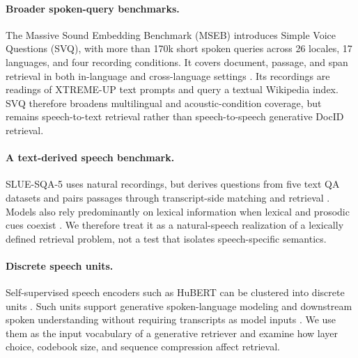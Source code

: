{\paragraph{Broader spoken-query benchmarks.}
The Massive Sound Embedding Benchmark (MSEB) introduces Simple Voice Questions
(SVQ), with more than 170k short spoken queries across 26 locales, 17
languages, and four recording conditions. It covers document, passage, and span
retrieval in both in-language and cross-language settings
\citep{Heigold2025MSEB}. Its recordings are readings of XTREME-UP text prompts
and query a textual Wikipedia index. SVQ therefore broadens multilingual and
acoustic-condition coverage, but remains speech-to-text retrieval rather than
speech-to-speech generative DocID retrieval.

\paragraph{A text-derived speech benchmark.}
SLUE-SQA-5 uses natural recordings, but derives questions from five text QA
datasets and pairs passages through transcript-side matching and retrieval
\citep{Shon2022SLUEPA}. Models also rely predominantly on lexical information
when lexical and prosodic cues coexist \citep{chi-etal-2025-role}. We therefore
treat it as a natural-speech realization of a lexically defined retrieval
problem, not a test that isolates speech-specific semantics.

\paragraph{Discrete speech units.}
Self-supervised speech encoders such as HuBERT can be clustered into discrete
units \citep{Hsu2021HuBERTSS}. Such units support generative spoken-language
modeling and downstream spoken understanding without requiring transcripts as
model inputs \citep{lakhotia-etal-2021-generative,lin22c_interspeech,
Shon2024DiscreteSLUAL}. We use them as the input vocabulary of a generative
retriever and examine how layer choice, codebook size, and sequence compression
affect retrieval.
}

